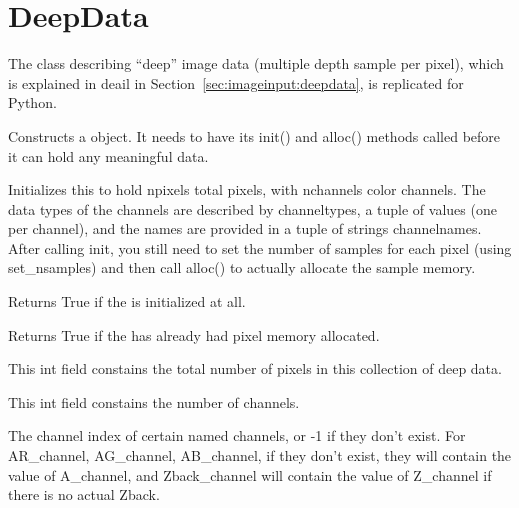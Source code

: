 \section{DeepData}
\label{sec:pythondeepdata}

The \DeepData class describing ``deep'' image data (multiple depth
sample per pixel), which is explained in deail in
Section~\ref{sec:imageinput:deepdata}, is replicated for Python.

Constructs a \DeepData object. It needs to have its {\cf init()} and
{\cf alloc()} methods called before it can hold any meaningful data.
\apiend

Initializes this \DeepData to hold {\cf npixels} total pixels, with
{\cf nchannels} color channels. The data types of the channels are
described by {\cf channeltypes}, a tuple of \TypeDesc values (one per
channel), and the names are provided in a tuple of {\cf string}s
{\cf channelnames}. After calling {\cf init}, you still need to set the number of
samples for each pixel (using {\cf set_nsamples}) and then call {\cf alloc()}
to actually allocate the sample memory.
\apiend

Returns {\cf True} if the \DeepData is initialized at all.
\apiend

Returns {\cf True} if the \DeepData has already had pixel memory allocated.
\apiend

This {\cf int} field constains the total number of pixels in this
collection of deep data.
\apiend

This {\cf int} field constains the number of channels.
\apiend

The channel index of certain named channels, or -1 if they don't exist. For
{\cf AR_channel}, {\cf AG_channel}, {\cf AB_channel}, if they don't exist,
they will contain the value of {\cf A_channel}, and {\cf Zback_channel} will
contain the value of {\cf Z_channel} if there is no actual {\cf Zback}.
\apiend

